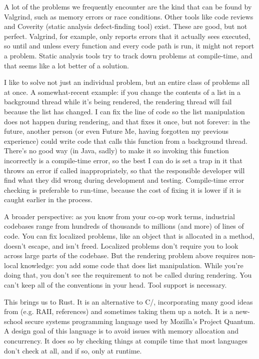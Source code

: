 A lot of the problems we frequently encounter are the kind that can be found by Valgrind, such as memory errors or race conditions. Other tools like code reviews and Coverity (static analysis defect-finding tool) exist. These are good, but not perfect. Valgrind, for example, only reports errors that it actually sees executed, so until and unless every function and every code path is run, it might not report a problem. Static analysis tools try to track down problems at compile-time, and that seems like a lot better of a solution.

I like to solve not just an individual problem, but an entire class of problems all at once. A somewhat-recent example: if you change the contents of a list in a background thread while it's being rendered, the rendering thread will fail because the list has changed. I can fix the line of code so the list manipulation does not happen during rendering, and that fixes it once, but not forever: in the future, another person (or even Future Me, having forgotten my previous experience) could write code that calls this function from a background thread. There's no good way (in Java, sadly) to make it so invoking this function incorrectly is a compile-time error, so the best I can do is set a trap in it that throws an error if called inappropriately, so that the responsible developer will find what they did wrong during development and testing. Compile-time error checking is preferable to run-time, because the cost of fixing it is lower if it is caught earlier in the process.

A broader perspective: as you know from your co-op work terms, industrial codebases range from hundreds of thousands to millions (and more) of lines of code. You can fix localized problems, like an object that is allocated in a method, doesn't escape, and isn't freed. Localized problems don't require you to look across large parts of the codebase. But the rendering problem above requires non-local knowledge: you add some code that does list manipulation. While you're doing that, you don't see the requirement to not be called during rendering. You can't keep all of the conventions in your head. Tool support is necessary.

This brings us to Rust. It is an alternative to C/\CPP, incorporating many good ideas from \CPP (e.g. RAII, references) and sometimes taking them up a notch. It is a new-school
secure systems programming language used by Mozilla's Project Quantum. A design goal of this language is to avoid issues with memory allocation and concurrency. It does so by checking things at compile time that most languages don't check at all, and if so, only at runtime.

